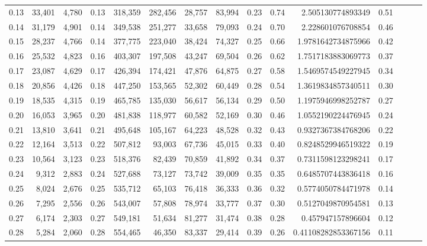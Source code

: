 \begin{tabular}{rrrrrrrrrrrrrrr}
0.13 &  33,401 &  4,780 &  0.13 &  318,359 &  282,456 &   28,757 &   83,994 &  0.23 &  0.74 &       2.505130774893349 &      0.51 \\
0.14 &  31,179 &  4,901 &  0.14 &  349,538 &  251,277 &   33,658 &   79,093 &  0.24 &  0.70 &       2.228601076708854 &      0.46 \\
0.15 &  28,237 &  4,766 &  0.14 &  377,775 &  223,040 &   38,424 &   74,327 &  0.25 &  0.66 &      1.9781642734875966 &      0.42 \\
0.16 &  25,532 &  4,823 &  0.16 &  403,307 &  197,508 &   43,247 &   69,504 &  0.26 &  0.62 &      1.7517183883069773 &      0.37 \\
0.17 &  23,087 &  4,629 &  0.17 &  426,394 &  174,421 &   47,876 &   64,875 &  0.27 &  0.58 &      1.5469574549227945 &      0.34 \\
0.18 &  20,856 &  4,426 &  0.18 &  447,250 &  153,565 &   52,302 &   60,449 &  0.28 &  0.54 &      1.3619834857340511 &      0.30 \\
0.19 &  18,535 &  4,315 &  0.19 &  465,785 &  135,030 &   56,617 &   56,134 &  0.29 &  0.50 &      1.1975946998252787 &      0.27 \\
0.20 &  16,053 &  3,965 &  0.20 &  481,838 &  118,977 &   60,582 &   52,169 &  0.30 &  0.46 &      1.0552190224476945 &      0.24 \\
0.21 &  13,810 &  3,641 &  0.21 &  495,648 &  105,167 &   64,223 &   48,528 &  0.32 &  0.43 &      0.9327367384768206 &      0.22 \\
0.22 &  12,164 &  3,513 &  0.22 &  507,812 &   93,003 &   67,736 &   45,015 &  0.33 &  0.40 &      0.8248529946519322 &      0.19 \\
0.23 &  10,564 &  3,123 &  0.23 &  518,376 &   82,439 &   70,859 &   41,892 &  0.34 &  0.37 &      0.7311598123298241 &      0.17 \\
0.24 &   9,312 &  2,883 &  0.24 &  527,688 &   73,127 &   73,742 &   39,009 &  0.35 &  0.35 &      0.6485707443836418 &      0.16 \\
0.25 &   8,024 &  2,676 &  0.25 &  535,712 &   65,103 &   76,418 &   36,333 &  0.36 &  0.32 &      0.5774050784471978 &      0.14 \\
0.26 &   7,295 &  2,556 &  0.26 &  543,007 &   57,808 &   78,974 &   33,777 &  0.37 &  0.30 &      0.5127049870954581 &      0.13 \\
0.27 &   6,174 &  2,303 &  0.27 &  549,181 &   51,634 &   81,277 &   31,474 &  0.38 &  0.28 &       0.457947157896604 &      0.12 \\
0.28 &   5,284 &  2,060 &  0.28 &  554,465 &   46,350 &   83,337 &   29,414 &  0.39 &  0.26 &     0.41108282853367156 &      0.11 \\

\end{tabular}
